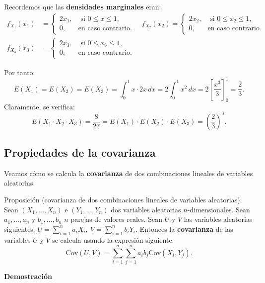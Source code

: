 \documentclass[]{book}
\begin{document}
Recordemos que las \textbf{densidades marginales} eran:
\[
\begin{array}{rl}
f_{X_1}(x_1) & =\begin{cases}
2x_1, & \mbox{ si }0\leq x\leq 1,\\
0, & \mbox{en caso contrario.}
\end{cases}\quad f_{X_2}(x_2)=\begin{cases}
2x_2, & \mbox{ si }0\leq x_2\leq 1,\\
0, & \mbox{en caso contrario.}
\end{cases}\\ f_{X_3}(x_3) & =\begin{cases}
2x_3, & \mbox{ si }0\leq x_3\leq 1,\\
0, & \mbox{en caso contrario.}
\end{cases}
\end{array}
\]

Por tanto:
\[
E(X_1)=E(X_2)=E(X_3)=\int_0^1 x\cdot 2 x\, dx =2 \int_0^1 x^2\, dx=2\left[\frac{x^3}{3}\right]_0^1=\frac{2}{3}.
\]
Claramente, se verifica:
\[
E(X_1\cdot X_2\cdot X_3)=\frac{8}{27}=E(X_1)\cdot E(X_2)\cdot E(X_3)=\left(\frac{2}{3}\right)^3.
\]

\hypertarget{propiedades-de-la-covarianza-1}{%
\subsection{Propiedades de la covarianza}\label{propiedades-de-la-covarianza-1}}

Veamos cómo se calcula la \textbf{covarianza} de dos combinaciones lineales de variables aleatorias:

Proposición (covarianza de dos combinaciones lineales de variables aleatorias).
Sean \((X_1,\ldots,X_n)\) e \((Y_1,\ldots, Y_n)\) dos variables aleatorias \(n\)-dimensionales. Sean \(a_1, \ldots, a_n\) y \(b_1,\ldots, b_n\) \(n\) parejas de valores reales. Sean \(U\) y \(V\) las variables aleatorias siguientes:
\(U=\sum\limits_{i=1}^n a_i X_i,\  V=\sum\limits_{i=1}^n b_i Y_i.\)
Entonces la \textbf{covarianza} de las variables \(U\) y \(V\) se calcula usando la expresión siguiente:
\[
\mathrm{Cov}(U,V)=\sum_{i=1}^n\sum_{j=1}^n a_i b_j \mathrm{Cov}(X_i,Y_j).
\]

\textbf{Demostración}
\end{document}
